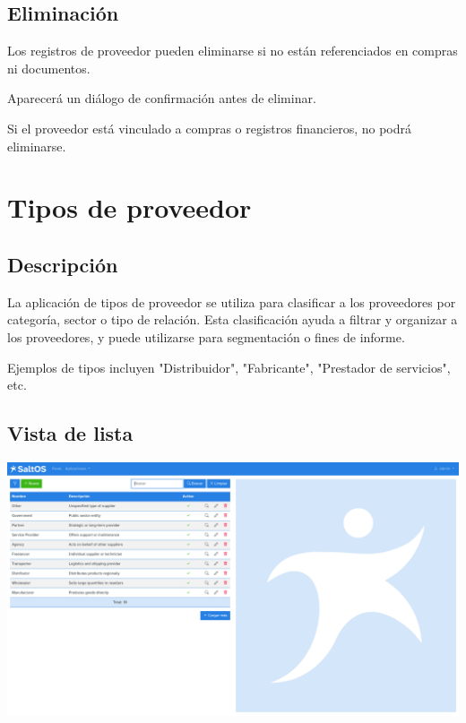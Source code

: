 \documentclass[a4paper]{article}
\begin{document}
\hypertarget{toc130}{}
\subsection{Eliminación}

Los registros de proveedor pueden eliminarse si no están referenciados en compras ni documentos.

Aparecerá un diálogo de confirmación antes de eliminar.

Si el proveedor está vinculado a compras o registros financieros, no podrá eliminarse.


\hypertarget{toc131}{}
\section{Tipos de proveedor}

\hypertarget{toc132}{}
\subsection{Descripción}

La aplicación de tipos de proveedor se utiliza para clasificar a los proveedores por categoría, sector o tipo de relación.
Esta clasificación ayuda a filtrar y organizar a los proveedores, y puede utilizarse para segmentación o fines de informe.

Ejemplos de tipos incluyen "Distribuidor", "Fabricante", "Prestador de servicios", etc.

\hypertarget{toc133}{}
\subsection{Vista de lista}

\begin{center}\includegraphics[width=1\textwidth]{../ujest/snaps/test-screenshots-js-screenshots-purchases-suppliers-types-list-es-es-1-snap.png}\end{center}
\end{document}
